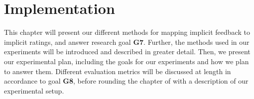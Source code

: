 
\chapter{Implementation}
\label{chap:implementaion}
\minitoc

This chapter will present our different methods for mapping implicit feedback to implicit 
ratings, and answer research goal \textbf{G7}. Further, the methods used in our experiments
will be introduced and described in greater detail. Then, we present our experimental plan,
including the goals for our experiments and how we plan to answer them. Different evaluation
metrics will be discussed at length in accordance to goal \textbf{G8}, before rounding the chapter
of with a description of our experimental setup.

\clearpage






